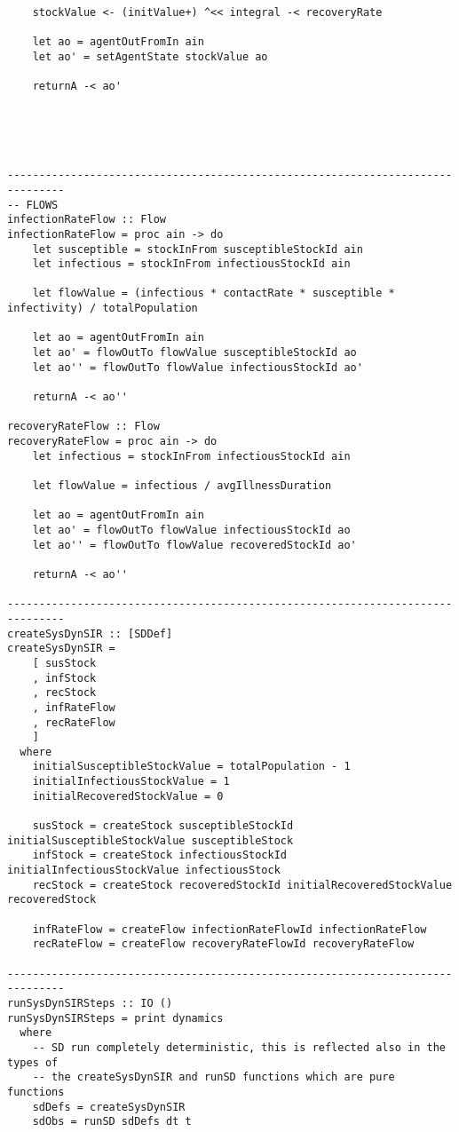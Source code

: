 \begin{verbatim}
    stockValue <- (initValue+) ^<< integral -< recoveryRate
    
    let ao = agentOutFromIn ain
    let ao' = setAgentState stockValue ao

    returnA -< ao'





-------------------------------------------------------------------------------
-- FLOWS
infectionRateFlow :: Flow
infectionRateFlow = proc ain -> do
    let susceptible = stockInFrom susceptibleStockId ain 
    let infectious = stockInFrom infectiousStockId ain

    let flowValue = (infectious * contactRate * susceptible * infectivity) / totalPopulation
    
    let ao = agentOutFromIn ain
    let ao' = flowOutTo flowValue susceptibleStockId ao
    let ao'' = flowOutTo flowValue infectiousStockId ao'

    returnA -< ao''

recoveryRateFlow :: Flow
recoveryRateFlow = proc ain -> do
    let infectious = stockInFrom infectiousStockId ain

    let flowValue = infectious / avgIllnessDuration
    
    let ao = agentOutFromIn ain
    let ao' = flowOutTo flowValue infectiousStockId ao
    let ao'' = flowOutTo flowValue recoveredStockId ao'

    returnA -< ao''

-------------------------------------------------------------------------------
createSysDynSIR :: [SDDef]
createSysDynSIR = 
    [ susStock
    , infStock
    , recStock
    , infRateFlow
    , recRateFlow
    ]
  where
    initialSusceptibleStockValue = totalPopulation - 1
    initialInfectiousStockValue = 1
    initialRecoveredStockValue = 0

    susStock = createStock susceptibleStockId initialSusceptibleStockValue susceptibleStock
    infStock = createStock infectiousStockId initialInfectiousStockValue infectiousStock
    recStock = createStock recoveredStockId initialRecoveredStockValue recoveredStock

    infRateFlow = createFlow infectionRateFlowId infectionRateFlow
    recRateFlow = createFlow recoveryRateFlowId recoveryRateFlow

-------------------------------------------------------------------------------
runSysDynSIRSteps :: IO ()
runSysDynSIRSteps = print dynamics
  where
    -- SD run completely deterministic, this is reflected also in the types of 
    -- the createSysDynSIR and runSD functions which are pure functions  
    sdDefs = createSysDynSIR
    sdObs = runSD sdDefs dt t 
            

\end{verbatim}
